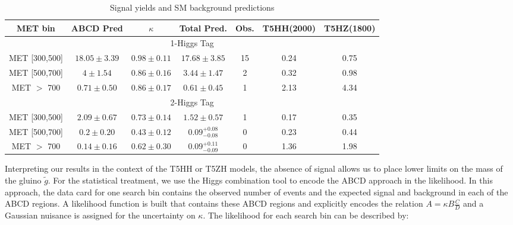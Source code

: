 \begin{table}[htbp!]
\caption{Signal yields and SM background predictions}
\centering
\begin{tabular}{c|c|c|c|c||c|c|}
\hline \hline
MET bin & ABCD Pred & $\kappa$ & Total Pred. & Obs. & T5HH(2000) & T5HZ(1800) \\
\hline \hline
\multicolumn{7}{c}{1-Higgs Tag} \\ \hline \hline
MET [300,500] & $18.05 \pm 3.39$  & $0.98 \pm 0.11$ & $17.68 \pm 3.85$ & 15 & 0.24 & 0.75  \\ \hline
MET [500,700] & $4 \pm 1.54$ & $0.86 \pm 0.16$ & $3.44\pm 1.47$ &  2  & 0.32 & 0.98 \\\hline
MET $>$ 700 &  $0.71 \pm 0.50$  &  $0.86 \pm 0.17$ & $0.61\pm 0.45$ &  1 & 2.13 & 4.34\\\hline \hline
\multicolumn{7}{c}{2-Higgs Tag} \\  \hline \hline
MET [300,500] &   $2.09 \pm 0.67$  & $0.73 \pm 0.14$ & $1.52 \pm 0.57$ & 1 & 0.17 & 0.35\\ \hline
MET [500,700] & $ 0.2 \pm 0.20$ & $0.43 \pm 0.12$ &$0.09^{+0.08}_{-0.08}$ & 0 & 0.23 & 0.44\\ \hline
MET $>$ 700 & $0.14 \pm 0.16$ & $0.62 \pm 0.30$ & $0.09^{+0.11}_{-0.09}$ & 0 & 1.36 & 1.98\\ \hline
\hline
\end{tabular}
\label{tab:DataPred}
\end{table}


Interpreting our results in the context of the T5HH or T5ZH models, the absence of signal allows us to place lower limits on the mass of the gluino $\tilde{g}$. For the statistical treatment, we use the Higgs combination tool to encode the ABCD approach in the likelihood. In this approach, the data card for one search bin contains the observed number of events and the expected signal and background in each of the ABCD regions. A likelihood function is built that contains these ABCD regions and explicitly encodes the relation $A=\kappa B \frac{C}{D}$ and a Gaussian nuisance is assigned for the uncertainty on $\kappa$. The likelihood for each search bin can be described by:

